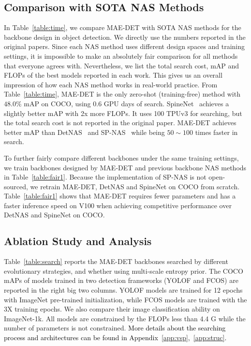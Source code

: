 \documentclass[nohyperref]{article}
\theoremstyle{plain}
\theoremstyle{definition}
\theoremstyle{remark}
\begin{document}
\subsection{Comparison with SOTA NAS Methods}\label{sub:efficiency}

In Table~\ref{table:time}, we compare MAE-DET with SOTA NAS methods for the backbone design in object detection. We directly use the numbers reported in the original papers. Since each NAS method uses different design spaces and training settings, it is impossible to make an absolutely fair comparison for all methods that everyone agrees with. Nevertheless, we list the total search cost, mAP and FLOPs of the best models reported in each work. This gives us an overall impression of how each NAS method works in real-world practice. From Table~\ref{table:time}, MAE-DET is the only zero-shot (training-free) method with $48.0\%$ mAP on COCO, using $0.6$ GPU days of search. SpineNet~\citep{spinenet} achieves a slightly better mAP with 2x more FLOPs. It uses 100 TPUv3 for searching, but the total search cost is not reported in the original paper. MAE-DET achieves better mAP than DetNAS~\citep{detnas} and SP-NAS~\citep{spnas} while being $50\sim 100$ times faster in search.


To further fairly compare different backbones under the same training settings, we train backbones designed by MAE-DET and previous backbone NAS methods in Table~\ref{table:fair1}. Because the implementation of SP-NAS is not open-sourced, we retrain MAE-DET, DetNAS and SpineNet on COCO from scratch. Table~\ref{table:fair1} shows that MAE-DET requires fewer parameters and has a faster inference speed on V100 when achieving competitive performance over DetNAS and SpineNet on COCO.



\subsection{Ablation Study and Analysis}
\label{sub:ablation}

Table~\ref{table:search} reports the MAE-DET backbones searched by different evolutionary strategies, and whether using multi-scale entropy prior. The COCO mAPs of models trained in two detection frameworks (YOLOF and FCOS) are reported in the right big two columns. YOLOF models are trained for 12 epochs with ImageNet pre-trained initialization, while FCOS models are trained with the 3X training epochs. We also compare their image classification ability on ImageNet-1k. All models are constrained by the FLOPs less than 4.4 G while the number of parameters is not constrained. \textcolor{black}{More details about the searching process and architectures can be found in Appendix~\ref{app:vsp},~\ref{app:struc}.}
\end{document}
